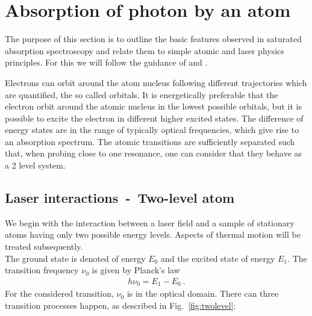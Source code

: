 
\ifpdf{}
\graphicspath{{Chapter2/Figs/Raster/}{Chapter2/Figs/PDF/}{Chapter2/Figs/}}
\else
\graphicspath{{Chapter2/Figs/Vector/}{Chapter2/Figs/}}
\fi

\chapter{Absorption of photon by an atom}  %
The purpose of this section is to outline the basic features observed in 
saturated absorption spectroscopy and relate them to simple atomic and laser 
physics principles. For this we will follow the guidance of \citep{SAS} and 
\citep{SAS_appendix}.

Electrons can orbit around the atom nucleus following different trajectories which
are quantified, the so called orbitals. It is energetically preferable that the
electron orbit around the atomic nucleus in the lowest possible orbitals, but it 
is possible to excite the electron in different higher excited states. The 
difference of energy states are in the range of typically optical frequencies, 
which give rise to an absorption spectrum. The atomic transitions are sufficiently 
separated such that, when probing close to one resonance, one can consider that 
they behave as a 2 level system.

\section{Laser interactions~-~Two-level atom} %

We begin with the interaction between a laser field and a sample of stationary 
atoms having only two possible energy levels. Aspects of thermal motion will 
be treated subsequently.\\ 
The ground state is denoted  of energy \(E_0 \) and the excited state 
 of energy \(E_1 \). The transition frequency \(\nu_0 \) is given by 
Planck's law
\begin{align}
    h \nu_0 = E_1 - E_0~.
\end{align}
For the considered transition, \(\nu_0 \) is in the optical domain.
There can three transition processes happen, as described in Fig.~\ref{fig:twolevel}:
\pagebreak

